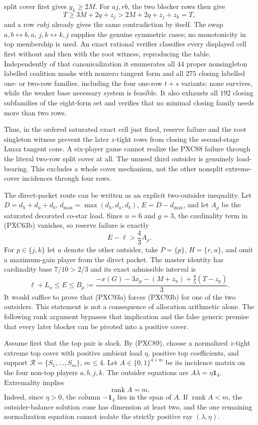 \documentclass[11pt]{article}
\newcommand{\one}{\mathbf 1}
\begin{document}
split cover first gives $y_h\ge2M$.  For $aj,rb$, the two blocker rows
then give
\[
 T\ge3M+2q+z_j>2M+2q+z_j+z_k=T,
\]
and a row $rabj$ already gives the same contradiction by itself.  The swap
$a,b\leftrightarrow b,a$, $j,k\leftrightarrow k,j$ supplies the genuine
symmetric cases; no monotonicity in top membership is used.  An exact
rational verifier classifies every displayed cell first without and then
with the root witness, reproducing the table.  Independently of that
canonicalization it enumerates all $44$ proper nonsingleton labelled
coalition masks with nonzero tangent form and all $275$ closing labelled
one- or two-row families, including the four one-row $t+s$ variants; none
survives, while the weaker base necessary system is feasible.  It also
exhausts all $192$ closing subfamilies of the eight-form set and verifies
that no minimal closing family needs more than two rows.

Thus, in the ordered saturated exact cell just fixed, reserve failure and the
root singleton witness prevent the later $z$-tight rows from closing the
second-stage Lmax tangent cone.  A six-player game cannot realize the PXC88
failure through the literal two-row split cover at all.  The unused third
outsider is genuinely load-bearing.  This excludes a whole cover mechanism,
not the other nonsplit extreme-cover incidences through four rows.

The direct-packet route can be written as an explicit two-outsider inequality.
Let $D=d_h+d_a+d_b$,
$d_{\max}=\max(d_h,d_a,d_b)$, $E=D-d_{\max}$, and let $A_\rho$ be the
saturated decorated co-star load.  Since $n=6$ and $g=3$, the cardinality
term in (PXC63b) vanishes, so reserve failure is exactly
\[
 E-\ell>\frac43A_\rho.                              \tag{PXC93a}
\]
For $p\in\{j,k\}$ let $u$ denote the other outsider, take
$P=\{p\}$, $H=\{r,u\}$, and omit a maximum-gain player from the direct
packet.  The master identity has cardinality base $7/10>2/3$ and its exact
admissible interval is
\[
 \ell+L_u\le E\le
 B_p:=\frac{-x(G)-3x_p-(M+z_u)+\frac85(T-z_p)}3.    \tag{PXC93b}
\]
It would suffice to prove that (PXC93a) forces (PXC93b) for one of the two
outsiders.  This statement is not a consequence of allocation arithmetic
alone.  The following rank argument bypasses that implication and the false
generic premise that every later blocker can be pivoted into a positive
cover.

Assume first that the top pair is slack.  By (PXC89), choose a normalized
$z$-tight extreme top cover with positive ambient load $\eta$, positive top
coefficients, and support $\mathcal R=\{S_1,\ldots,S_m\}$, $m\le4$.  Let
$A\in\{0,1\}^{4\times m}$ be its incidence matrix on the four non-top players
$a,b,j,k$.  The outsider equations are
$A\lambda=\eta\one_4$.  Extremality implies
\[
                       \operatorname{rank}A=m.       \tag{PXC94a}
\]
Indeed, since $\eta>0$, the column $-\one_4$ lies in the span of $A$.
If $\operatorname{rank}A<m$, the outsider-balance solution cone has dimension
at least two, and the one remaining normalization equation cannot isolate the
strictly positive ray $(\lambda,\eta)$.
\end{document}
